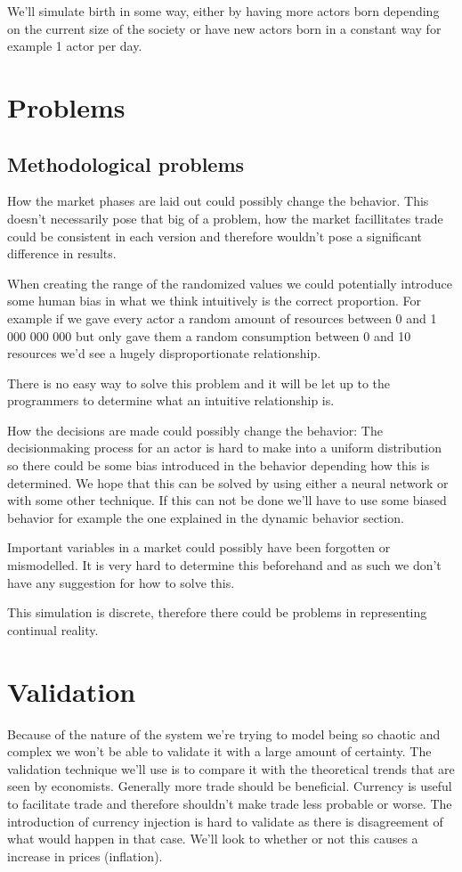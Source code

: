 \documentclass[11p]{article}
\begin{document}
We'll simulate birth in some way, either by having more actors born depending on the current size of the society or have new actors born in a constant way for example 1 actor per day.
\section{Problems}
\subsection{Methodological problems}
How the market phases are laid out could possibly change the behavior. This doesn't necessarily pose that big of a problem, how the market facillitates trade could be consistent in each version and therefore wouldn't pose a significant difference in results.

When creating the range of the randomized values we could potentially introduce some human bias in what we think intuitively is the correct proportion. For example if we gave every actor a random amount of resources between 0 and 1 000 000 000 but only gave them a random consumption between 0 and 10 resources we'd see a hugely disproportionate relationship.

There is no easy way to solve this problem and it will be let up to the programmers to determine what an intuitive relationship is.

How the decisions are made could possibly change the behavior: The decisionmaking process for an actor is hard to make into a uniform distribution so there could be some bias introduced in the behavior depending how this is determined. We hope that this can be solved by using either a neural network or with some other technique. If this can not be done we'll have to use some biased behavior for example the one explained in the dynamic behavior section.

Important variables in a market could possibly have been forgotten or mismodelled. It is very hard to determine this beforehand and as such we don't have any suggestion for how to solve this.

This simulation is discrete, therefore there could be problems in representing continual reality.
\section{Validation}
Because of the nature of the system we're trying to model being so chaotic and complex we won't be able to validate it with a large amount of certainty. The validation technique we'll use is to compare it with the theoretical trends that are seen by economists. Generally more trade should be beneficial. Currency is useful to facilitate trade and therefore shouldn't make trade less probable or worse. The introduction of currency injection is hard to validate as there is disagreement of what would happen in that case. We'll look to whether or not this causes a increase in prices (inflation).
\end{document}
